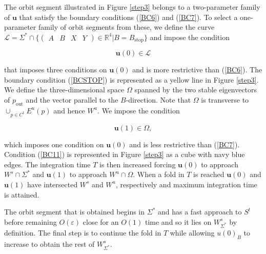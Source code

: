 \documentclass{ws-ijbc}
\begin{document}
The orbit segment illustrated in Figure \ref{step3} belongs to a two-parameter family of $\mathbf{u}$ that satisfy the boundary conditions (\ref{BC6}) and (\ref{BC7}).  To select a one-parameter family of orbit segments from these, we define the curve $\mathscr{L} = \Sigma^*\cap \{ \begin{pmatrix} A & B & X & Y \end{pmatrix} \in \mathbb{R}^4 | B = B_{\text{stop}}\}$ and impose the condition
    
    
\begin{equation}
\mathbf{u}(0) \in \mathscr{L}
\label{BCSTOP}
\end{equation}
    
\noindent
that imposes three conditions on $\mathbf{u}(0)$ and is more restrictive than (\ref{BC6}).  The boundary condition (\ref{BCSTOP}) is represented as a yellow line in Figure \ref{step3}.  We define the three-dimensional space $\Omega$ spanned by the two stable eigenvectors of $p_{\text{out}}$ and the vector parallel to the $B$-direction.  Note that $\Omega$ is transverse to $\cup_{p \in C^t}E^u(p)$ and hence $W^u$.  We impose the condition
    
\begin{equation}
\mathbf{u}(1) \in \Omega,
\label{BC11}
\end{equation}
    
\noindent
which imposes one condition on $\mathbf{u}(0)$ and is less restrictive than (\ref{BC7}).  Condition (\ref{BC11}) is represented in Figure \ref{step3} as a cube with navy blue edges.  The integration time $T$ is then increased forcing $\mathbf{u}(0)$ to approach $W^s \cap \Sigma^*$ and $\mathbf{u}(1)$ to approach $W^u \cap \Omega$. When a fold in $T$ is reached $\mathbf{u}(0)$ and $\mathbf{u}(1)$ have intersected $W^s$ and $W^u$, respectively and maximum integration time is attained.  
    
The orbit segment that is obtained begins in $\Sigma^*$ and has a fast approach to $S^t$ before remaining $O(\varepsilon)$ close for an $O(1)$ time and so it lies on $W^{s}_{\Sigma^*}$ by definition.  The final step is to continue the fold in $T$ while allowing $u(0)_B$ to increase to obtain the rest of $W^{s}_{\Sigma^*}$.  
\end{document}
